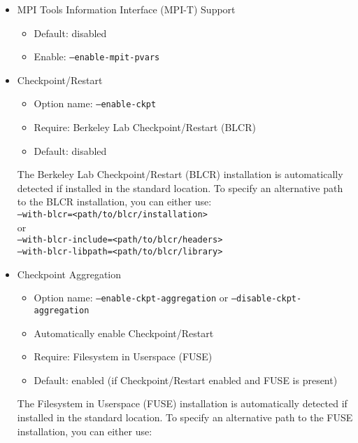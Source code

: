 \begin{itemize}
    \item MPI Tools Information Interface (MPI-T) Support
        \begin{itemize}
            \item Default: disabled
            \item Enable: \texttt{--enable-mpit-pvars}
        \end{itemize}
    
    \item Checkpoint/Restart
        \begin{itemize}
          \item Option name: \texttt{--enable-ckpt}
          \item Require: Berkeley Lab Checkpoint/Restart (BLCR)
          \item Default: disabled
        \end{itemize}

        The Berkeley Lab Checkpoint/Restart (BLCR) installation is automatically
        detected if installed in the standard location. To specify an alternative
        path to the BLCR installation, you can either use:\\

        \texttt{--with-blcr=<path/to/blcr/installation> } \\
        or \\
        \texttt{--with-blcr-include=<path/to/blcr/headers> \\
                --with-blcr-libpath=<path/to/blcr/library>}


    \item Checkpoint Aggregation
        \begin{itemize}
          \item Option name: \texttt{--enable-ckpt-aggregation} or \texttt{--disable-ckpt-aggregation}
          \item Automatically enable Checkpoint/Restart
          \item Require: Filesystem in Userspace (FUSE)
          \item Default: enabled (if Checkpoint/Restart enabled and FUSE is present)
        \end{itemize}

        The Filesystem in Userspace (FUSE) installation is automatically detected
        if installed in the standard location. To specify an alternative path to
        the FUSE installation, you can either use:\\


\end{itemize}
